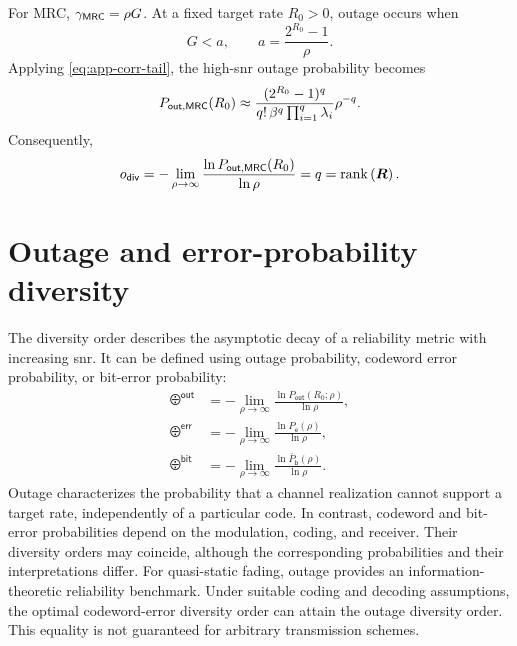 For MRC, $\gamma_{\mathsf{MRC}}=\rho G$. At a fixed target rate $R_0>0$, outage occurs when
\begin{equation*}
	G<a,\qquad
	a=\frac{2^{R_0}-1}{\rho}.
\end{equation*}
Applying \eqref{eq:app-corr-tail}, the high-\ac{snr} outage probability becomes
\begin{equation*}
	P_{\mathsf{out},\mathsf{MRC}}(R_0)
	\approx
	\frac{(2^{R_0}-1)^q}
	{q!\,\beta^q\prod_{i=1}^{q}\lambda_i}
	\rho^{-q}.
\end{equation*}
Consequently,
\begin{equation*}
	o_{\mathsf{div}}
	=-\lim_{\rho\to\infty}
	\frac{\ln P_{\mathsf{out},\mathsf{MRC}}(R_0)}
	{\ln\rho}
	=q=\operatorname{rank}\left(\bm{R}\right).
\end{equation*}


\section{Outage and error-probability diversity}
\label{app:outage-error}

The diversity order describes the asymptotic decay of a reliability metric with increasing \ac{snr}. It can be defined using outage probability, codeword error probability, or bit-error probability:
\begin{align*}
	\odiv^{\mathsf{out}}
	&=-\lim_{\rho\to\infty}
	\frac{\ln P_{\mathsf{out}}(R_0;\rho)}{\ln\rho},\\
	\odiv^{\mathsf{err}}
	&=-\lim_{\rho\to\infty}
	\frac{\ln P_{\mathsf e}(\rho)}{\ln\rho},\\
	\odiv^{\mathsf{bit}}
	&=-\lim_{\rho\to\infty}
	\frac{\ln \overline P_{\mathsf b}(\rho)}{\ln\rho}.
\end{align*}
Outage characterizes the probability that a channel realization cannot support a target rate, independently of a particular code. In contrast, codeword and bit-error probabilities depend on the modulation, coding, and receiver. Their diversity orders may coincide, although the corresponding probabilities and their interpretations differ.
%
For quasi-static fading, outage provides an information-theoretic reliability benchmark. Under suitable coding and decoding assumptions, the optimal codeword-error diversity order can attain the outage diversity order. This equality is not guaranteed for arbitrary transmission schemes.

